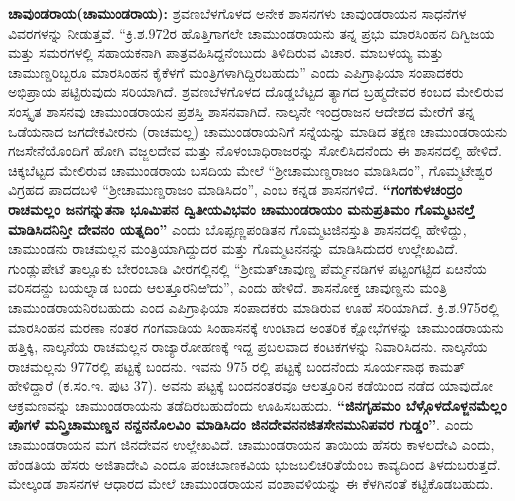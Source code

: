 \textbf{ಚಾವುಂಡರಾಯ(ಚಾಮುಂಡರಾಯ): }ಶ್ರವಣಬೆಳಗೊಳದ ಅನೇಕ ಶಾಸನಗಳು ಚಾವುಂಡರಾಯನ ಸಾಧನೆಗಳ ವಿವರ\-ಗಳನ್ನು ನೀಡುತ್ತವೆ. “ಕ್ರಿ.ಶ.972ರ ಹೊತ್ತಿಗಾಗಲೇ ಚಾಮುಂಡರಾಯನು ತನ್ನ ಪ್ರಭು ಮಾರಸಿಂಹನ ದಿಗ್ವಿಜಯ ಮತ್ತು ಸಮರಗಳಲ್ಲಿ ಸಹಾಯಕನಾಗಿ ಪಾತ್ರವಹಿಸಿದ್ದನೆಂಬುದು ತಿಳಿದಿರುವ ವಿಚಾರ. ಮಾಬಳಯ್ಯ ಮತ್ತು ಚಾಮುಣ್ಡರಿಬ್ಬರೂ ಮಾರಸಿಂಹನ ಕೈಕೆಳಗೆ ಮಂತ್ರಿಗಳಾಗಿದ್ದಿರಬಹುದು” ಎಂದು ಎಪಿಗ್ರಾಫಿಯಾ ಸಂಪಾದಕರು ಅಭಿಪ್ರಾಯ ಪಟ್ಟಿರುವುದು ಸರಿಯಾಗಿದೆ. ಶ್ರವಣಬೆಳಗೊಳದ ದೊಡ್ಡಬೆಟ್ಟದ ತ್ಯಾಗದ ಬ್ರಹ್ಮದೇವರ ಕಂಬದ ಮೇಲಿರುವ ಸಂಸ್ಕೃತ ಶಾಸನವು ಚಾಮುಂಡರಾಯನ ಪ್ರಶಸ್ತಿ ಶಾಸನವಾಗಿದೆ. ನಾಲ್ಕನೇ ಇಂದ್ರರಾಜನ ಆದೇಶದ ಮೇರೆಗೆ ತನ್ನ ಒಡೆಯನಾದ ಜಗದೇಕವೀರನು (ರಾಚಮಲ್ಲ) ಚಾಮುಂಡರಾಯನಿಗೆ ಸನ್ನೆಯನ್ನು ಮಾಡಿದ ತಕ್ಷಣ ಚಾಮುಂಡರಾಯನು ಗಜಸೇನೆಯೊಂದಿಗೆ ಹೋಗಿ ವಜ್ಜಲದೇವ ಮತ್ತು ನೊಳಂಬಾಧಿರಾಜರನ್ನು ಸೋಲಿಸಿದನೆಂದು ಈ ಶಾಸನದಲ್ಲಿ ಹೇಳಿದೆ. ಚಿಕ್ಕಬೆಟ್ಟದ ಮೇಲಿರುವ ಚಾಮುಂಡರಾಯ ಬಸದಿಯ ಮೇಲೆ “ಶ‍್ರೀಚಾಮುಣ್ಡರಾಜಂ ಮಾಡಿಸಿದಂ”, ಗೊಮ್ಮಟೇಶ್ವರ ವಿಗ್ರಹದ ಪಾದದಬಳಿ “ಶ‍್ರೀಚಾಮುಣ್ಡರಾಜಂ ಮಾಡಿಸಿದಂ”, ಎಂಬ ಕನ್ನಡ ಶಾಸನಗಳಿದೆ. \textbf{“ಗಂಗಕುಳಚಂದ್ರಂ ರಾಚಮಲ್ಲಂ ಜನಗನ್ನುತನಾ ಭೂಮಿಪನ ದ್ವಿತೀಯವಿಭವಂ ಚಾಮುಂಡರಾಯಂ ಮನುಪ್ರತಿಮಂ ಗೊಮ್ಮಟನಲ್ತೆ ಮಾಡಿಸಿದನಿನ್ತೀ ದೇವನಂ ಯತ್ನದಿಂ”} ಎಂದು ಬೊಪ್ಪಣ್ಣಪಂಡಿತನ ಗೊಮ್ಮಟಜಿನಸ್ತುತಿ ಶಾಸನದಲ್ಲಿ ಹೇಳಿದ್ದು, ಚಾಮುಂಡನು ರಾಚಮಲ್ಲನ ಮಂತ್ರಿಯಾಗಿದ್ದುದರ ಮತ್ತು ಗೊಮ್ಮಟನನನ್ನು ಮಾಡಿಸಿದುದರ ಉಲ್ಲೇಖವಿದೆ. ಗುಂಡ್ಲುಪೇಟೆ ತಾಲ್ಲೂಕು ಬೇರಂಬಾಡಿ ವೀರಗಲ್ಲಿನಲ್ಲಿ “ಶ‍್ರೀಮತ್​ ಚಾವುಣ್ಡ ಪೆರ್ಮ್ಮನಡಿಗಳ ಪಟ್ಟಂಗಟ್ಟಿದ ಏೞನೆಯ ವರಿಸದನ್ದು ಬಯಲ್ನಾಡ ಬಂದು ಆಲತ್ತೂರನಿಱಿದು”, ಎಂದು ಹೇಳಿದೆ. ಶಾಸನೋಕ್ತ ಚಾವುಣ್ಡನು ಮಂತ್ರಿ ಚಾಮುಂಡರಾಯನಿರಬಹುದು ಎಂದ ಎಪಿಗ್ರಾಫಿಯಾ ಸಂಪಾದಕರು ಮಾಡಿರುವ ಊಹೆ ಸರಿಯಾಗಿದೆ. ಕ್ರಿ.ಶ.975ರಲ್ಲಿ ಮಾರಸಿಂಹನ ಮರಣಾ ನಂತರ ಗಂಗವಾಡಿಯ ಸಿಂಹಾಸನಕ್ಕೆ ಉಂಟಾದ ಅಂತರಿಕ ಕ್ಷೋಭೆಗಳನ್ನು ಚಾಮುಂಡರಾಯನು ಹತ್ತಿಕ್ಕಿ, ನಾಲ್ಕನೆಯ ರಾಚಮಲ್ಲನ ರಾಜ್ಯಾರೋಹಣಕ್ಕೆ ಇದ್ದ ಪ್ರಬಲವಾದ ಕಂಟಕಗಳನ್ನು ನಿವಾರಿಸಿದನು. ನಾಲ್ಕನೆಯ ರಾಚಮಲ್ಲನು 977ರಲ್ಲಿ ಪಟ್ಟಕ್ಕೆ ಬಂದನು. ಇವನು 975 ರಲ್ಲಿ ಪಟ್ಟಕ್ಕೆ ಬಂದನೆಂದು ಸೂರ್ಯನಾಥ ಕಾಮತ್ ಹೇಳಿದ್ದಾರೆ (ಕ.ಸಂ.ಇ. ಪುಟ 37). ಅವನು ಪಟ್ಟಕ್ಕೆ ಬಂದನಂತರವೂ ಆಲತ್ತೂರಿನ ಕಡೆಯಿಂದ ನಡೆದ ಯಾವುದೋ ಆಕ್ರಮಣವನ್ನು ಚಾಮುಂಡರಾಯನು ತಡೆದಿರಬಹುದೆಂದು ಊಹಿಸಬಹುದು. \textbf{“ಜಿನಗೃಹಮಂ ಬೆಳ್ಗೊಳದೊಳ್ಜನಮೆಲ್ಲಂ ಪೊಗಳೆ ಮನ್ತ್ರಿಚಾಮುಣ್ಡನ ನನ್ದನನೊಲವಿಂ ಮಾಡಿಸಿದಂ ಜಿನದೇವನನಜಿತಸೇನಮುನಿಪವರ ಗುಡ್ಡಂ”}. ಎಂದು ಚಾಮುಂಡರಾಯನ ಮಗ ಜಿನದೇವನ ಉಲ್ಲೇಖವಿದೆ. ಚಾಮುಂಡರಾಯನ ತಾಯಿಯ ಹೆಸರು ಕಾಳಲದೇವಿ ಎಂದು, ಹೆಂಡತಿಯ ಹೆಸರು ಅಜಿತಾದೇವಿ ಎಂದೂ ಪಂಚಬಾಣಕವಿಯ ಭುಜಬಲಿಚರಿತೆಯೆಂಬ ಕಾವ್ಯದಿಂದ ತಿಳದುಬರುತ್ತದೆ. ಮೇಲ್ಕಂಡ ಶಾಸನಗಳ ಆಧಾರದ ಮೇಲೆ ಚಾಮುಂಡರಾಯನ ವಂಶಾವಳಿಯನ್ನು ಈ ಕೆಳಗಿನಂತೆ ಕಟ್ಟಿಕೊಡಬಹುದು.

